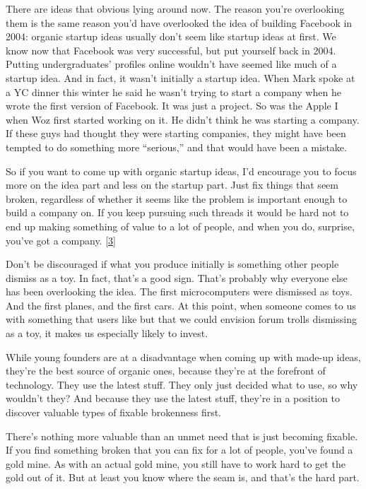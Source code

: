 There are ideas that obvious lying around now. The reason you're
overlooking them is the same reason you'd have overlooked the idea of
building Facebook in 2004: organic startup ideas usually don't seem like
startup ideas at first. We know now that Facebook was very successful,
but put yourself back in 2004. Putting undergraduates' profiles online
wouldn't have seemed like much of a startup idea. And in fact, it wasn't
initially a startup idea. When Mark spoke at a YC dinner this winter he
said he wasn't trying to start a company when he wrote the first version
of Facebook. It was just a project. So was the Apple I when Woz first
started working on it. He didn't think he was starting a company. If
these guys had thought they were starting companies, they might have
been tempted to do something more ``serious,'' and that would have been
a mistake.

So if you want to come up with organic startup ideas, I'd encourage you
to focus more on the idea part and less on the startup part. Just fix
things that seem broken, regardless of whether it seems like the problem
is important enough to build a company on. If you keep pursuing such
threads it would be hard not to end up making something of value to a
lot of people, and when you do, surprise, you've got a company.
{[}\hyperref[f3n]{3}{]}

Don't be discouraged if what you produce initially is something other
people dismiss as a toy. In fact, that's a good sign. That's probably
why everyone else has been overlooking the idea. The first
microcomputers were dismissed as toys. And the first planes, and the
first cars. At this point, when someone comes to us with something that
users like but that we could envision forum trolls dismissing as a toy,
it makes us especially likely to invest.

While young founders are at a disadvantage when coming up with made-up
ideas, they're the best source of organic ones, because they're at the
forefront of technology. They use the latest stuff. They only just
decided what to use, so why wouldn't they? And because they use the
latest stuff, they're in a position to discover valuable types of
fixable brokenness first.

There's nothing more valuable than an unmet need that is just becoming
fixable. If you find something broken that you can fix for a lot of
people, you've found a gold mine. As with an actual gold mine, you still
have to work hard to get the gold out of it. But at least you know where
the seam is, and that's the hard part.

